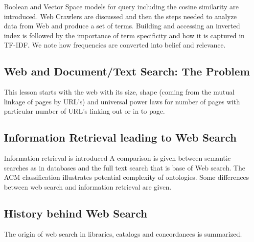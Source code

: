 Boolean and Vector Space models for query including the cosine
similarity are introduced. Web Crawlers are discussed and then the steps
needed to analyze data from Web and produce a set of terms. Building and
accessing an inverted index is followed by the importance of term
specificity and how it is captured in TF-IDF. We note how frequencies
are converted into belief and relevance.


\subsection{Web and Document/Text Search: The
Problem}\label{web-and-documenttext-search-the-problem}


This lesson starts with the web with its size, shape (coming from the
mutual linkage of pages by URL's) and universal power laws for number of
pages with particular number of URL's linking out or in to page.



\subsection{Information Retrieval leading to Web
Search}\label{information-retrieval-leading-to-web-search}


Information retrieval is introduced A comparison is given between
semantic searches as in databases and the full text search that is base
of Web search. The ACM classification illustrates potential complexity
of ontologies. Some differences between web search and information
retrieval are given.



\subsection{History behind Web Search}\label{history-behind-web-search}


The origin of web search in libraries, catalogs and concordances is
summarized.




